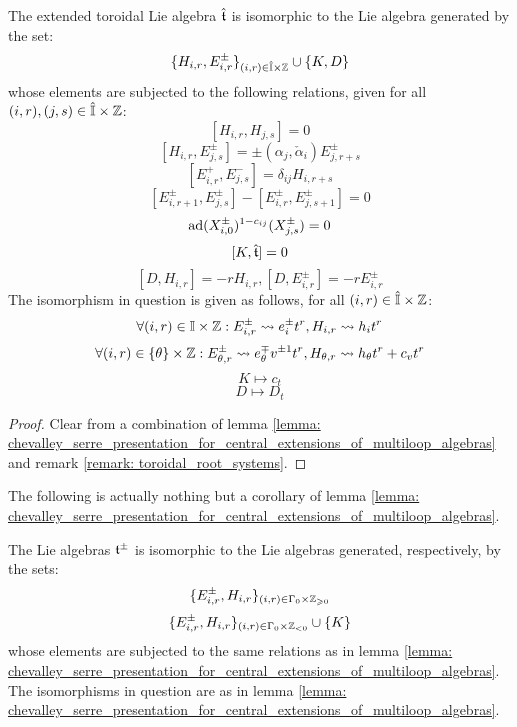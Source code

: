         \begin{lemma} \label{lemma: chevalley_serre_presentation_for_extended_toroidal_lie_algebras}
            The extended toroidal Lie algebra $\hat{\mathfrak{t}}$ is isomorphic to the Lie algebra generated by the set:
                $$\{ H_{i, r}, E_{i, r}^{\pm} \}_{(i, r) \in \hat{\simpleroots} \x \Z} \cup \{K, D\}$$
            whose elements are subjected to the following relations, given for all $(i, r), (j, s) \in \hat{\simpleroots} \x \Z$:
                $$[ H_{i, r}, H_{j, s} ] = 0$$
                $$[ H_{i, r}, E_{j, s}^{\pm} ] = \pm (\alpha_j, \check{\alpha}_i) E_{j, r + s}^{\pm}$$
                $$[ E_{i, r}^+, E_{j, s}^- ] = \delta_{ij} H_{i, r + s}$$
                $$[ E_{i, r + 1}^{\pm}, E_{j, s}^{\pm} ] - [ E_{i, r}^{\pm}, E_{j, s + 1}^{\pm} ] = 0$$
                $$\mathrm{ad}(X_{i, 0}^{\pm})^{1 - c_{ij}}( X_{j, s}^{\pm} ) = 0$$
                $$[K, \hat{\mathfrak{t}}] = 0$$
                $$[D, H_{i, r}] = -r H_{i, r}, [D, E_{i, r}^{\pm}] = -r E_{i, r}^{\pm}$$
            The isomorphism in question is given as follows, for all $(i, r) \in \hat{\simpleroots} \x \Z$:
                $$\forall (i, r) \in \simpleroots \x \Z: E_{i, r}^{\pm} \mapsto e_i^{\pm} t^r, H_{i, r} \mapsto h_i t^r$$
                $$\forall (i, r) \in \{\theta\} \x \Z: E_{\theta, r}^{\pm} \mapsto e_{\theta}^{\mp} v^{\pm 1} t^r, H_{\theta, r} \mapsto h_{\theta} t^r + c_v t^r$$
                $$K \mapsto c_t$$
                $$D \mapsto D_t$$
        \end{lemma}
            \begin{proof}
                Clear from a combination of lemma \ref{lemma: chevalley_serre_presentation_for_central_extensions_of_multiloop_algebras} and remark \ref{remark: toroidal_root_systems}.
            \end{proof}
        \begin{remark} \label{remark: chevalley_serre_presentation_for_central_extensions_of_multiloop_algebras}
            The following is actually nothing but a corollary of lemma \ref{lemma: chevalley_serre_presentation_for_central_extensions_of_multiloop_algebras}.
        
            The Lie algebras $\mathfrak{t}^{\pm}$ is isomorphic to the Lie algebras generated, respectively, by the sets:
                $$\{ E_{i, r}^{\pm}, H_{i, r} \}_{(i, r) \in \Gamma_0 \x \Z_{\geq 0}}$$
                $$\{ E_{i, r}^{\pm}, H_{i, r} \}_{(i, r) \in \Gamma_0 \x \Z_{< 0}} \cup \{K\}$$
            whose elements are subjected to the same relations as in lemma \ref{lemma: chevalley_serre_presentation_for_central_extensions_of_multiloop_algebras}. The isomorphisms in question are as in lemma \ref{lemma: chevalley_serre_presentation_for_central_extensions_of_multiloop_algebras}.
        \end{remark}
